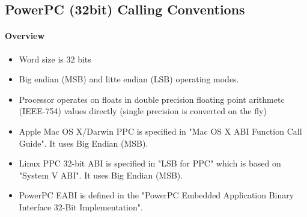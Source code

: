 %
%
%
%

\subsection{PowerPC (32bit) Calling Conventions}

\paragraph{Overview}

\begin{itemize}
\item Word size is 32 bits
\item Big endian (MSB) and litte endian (LSB) operating modes.
\item Processor operates on floats in double precision floating point arithmetc (IEEE-754) values directly (single precision is converted on the fly)
\item Apple Mac OS X/Darwin PPC is specified in "Mac OS X ABI Function Call Guide"\cite{ppcMacOSX}. It uses Big Endian (MSB).
\item Linux PPC 32-bit ABI is specified in "LSB for PPC"\cite{ppc32LSB} which is based on "System V ABI". It uses Big Endian (MSB).
\item PowerPC EABI is defined in the "PowerPC Embedded Application Binary Interface 32-Bit Implementation".
\end{itemize}


